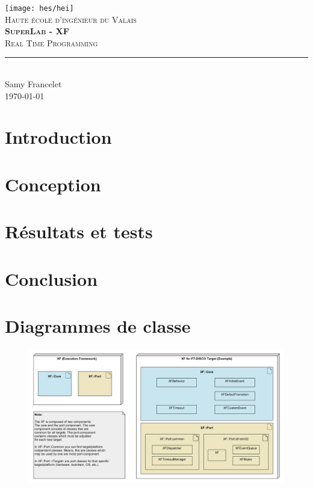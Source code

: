 \documentclass[11pt,titlepage]{report}
\begin{document}
\begin{titlepage}
	\centering
    \texttt{[image: hes/hei]}\\[1cm] 	%
    \textsc{\LARGE Haute école d'ingénieur du Valais}\\ \vspace{\fill}
    \textbf{\textsc{\fontsize{35}{35}\selectfont SuperLab - XF}}\\ \vspace{\fill}
	\textsc{\LARGE Real Time Programming}\\[0.4cm]
	\rule{\linewidth}{0.2 mm}\\[0.5cm]
	Samy Francelet \\
	\today
\end{titlepage}
\restoregeometry

\tableofcontents

\chapter{Introduction}


\chapter{Conception}


\chapter{Résultats et tests}


%

\chapter{Conclusion}


\appendix
\chapter{Diagrammes de classe}
\begin{figure}[H]
	\centering
	\includegraphics[angle=90, height=0.7\textheight]{Images/xf/comp-simple-xf.png}
\end{figure}
\end{document}
